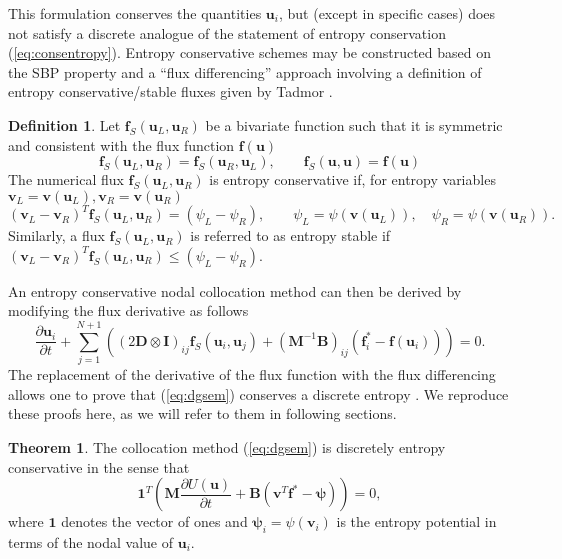 \documentclass[preprint,10pt]{article}
\theoremstyle{definition}
\newtheorem{definition}{Definition}
\theoremstyle{lemma}
\theoremstyle{theorem}
\newtheorem{theorem}{Theorem}
\newcommand{\pd}[2]{\frac{\partial#1}{\partial#2}}
\newcommand{\LRp}[1]{\left( #1 \right)}
\begin{document}
This formulation conserves the quantities $\bm{u}_i$, but (except in specific cases) does not satisfy a discrete analogue of the statement of entropy conservation (\ref{eq:consentropy}).  Entropy conservative schemes may be constructed based on the SBP property and a ``flux differencing'' approach \cite{gassner2016split} involving a definition of entropy conservative/stable fluxes given by Tadmor \cite{tadmor1987numerical, tadmor2003entropy}.  
\begin{definition}
Let $\bm{f}_S(\bm{u}_L,\bm{u}_R)$ be a bivariate function such that it is symmetric and consistent with the flux function $\bm{f}(\bm{u})$
\[
\bm{f}_S(\bm{u}_L,\bm{u}_R) = \bm{f}_S(\bm{u}_R,\bm{u}_L), \qquad \bm{f}_S(\bm{u},\bm{u}) = \bm{f}(\bm{u})
\]
The numerical flux $\bm{f}_S(\bm{u}_L, \bm{u}_R)$ is entropy conservative if, for entropy variables $\bm{v}_L = \bm{v}(\bm{u}_L), \bm{v}_R = \bm{v}(\bm{u}_R)$
\[
\LRp{\bm{v}_L - \bm{v}_R}^T \bm{f}_S(\bm{u}_L,\bm{u}_R) = (\psi_L - \psi_R), \qquad \psi_L = \psi(\bm{v}(\bm{u}_L)), \quad \psi_R = \psi(\bm{v}(\bm{u}_R)).  
\]
Similarly, a flux $\bm{f}_S(\bm{u}_L, \bm{u}_R)$ is referred to as entropy stable if $\LRp{\bm{v}_L - \bm{v}_R}^T \bm{f}_S(\bm{u}_L,\bm{u}_R) \leq (\psi_L - \psi_R)$.
\label{def:tadmor}
\end{definition}
An entropy conservative nodal collocation method can then be derived by modifying the flux derivative as follows
\begin{equation}
\pd{\bm{u}_i}{t} + \sum_{j=1}^{N+1}\LRp{\LRp{2\bm{D}\otimes \bm{I}}_{ij}\bm{f}_S(\bm{u}_i,\bm{u}_j) +\LRp{\bm{M}^{-1}\bm{B}}_{ij}(\bm{f}_i^* - \bm{f}(\bm{u}_i))}= 0.
\label{eq:dgsem}
\end{equation}
The replacement of the derivative of the flux function with the flux differencing allows one to prove that (\ref{eq:dgsem}) conserves a discrete entropy \cite{gassner2017br1,chen2017entropy}.  We reproduce these proofs here, as we will refer to them in following sections.  
\begin{theorem}
The collocation method (\ref{eq:dgsem}) is discretely entropy conservative in the sense that
\[
\bm{1}^T\LRp{\bm{M}\pd{U(\bm{u})}{t} + \bm{B}\LRp{\bm{v}^T\bm{f}^* - \bm{\psi}}} = 0,
\]
where $\bm{1}$ denotes the vector of ones and $\bm{\psi}_i = \psi(\bm{v}_i)$ is the entropy potential in terms of the nodal value of $\bm{u}_i$.  
\label{thm:dgsem}
\end{theorem}
\end{document}
